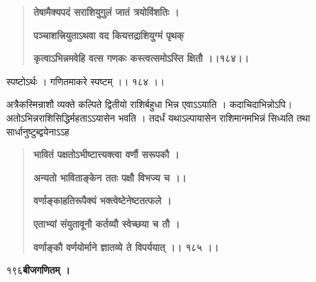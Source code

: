 \documentclass[11pt, openany]{book}
\begin{document}
\begin{sloppypar}
\begin{quote}
\hspace{1in}\textbf{तेषामैक्यपदं सराशियुगुलं जातं त्रयोविंशतिः ।}

\hspace{1in}\textbf{पञ्चाशत्त्रियुताऽथवा वद कियत्तद्राशियुग्मं पृथक्}

\hspace{1in}\textbf{कृत्वाऽभिन्नमवेहि वत्स गणकः कस्त्वत्समोऽस्ति क्षितौ ।।१८४।।}
\end{quote}

\hangindent=0.2in \hspace{0.2in}स्पष्टोऽर्थः । गणितमाकरे स्पष्टम् ।। १८४ ।। 

\hangindent=0.2in \hspace{0.2in}अत्रैकस्मिन्राशौ व्यक्ते कल्पिते द्वितीयो राशिर्बहुधा भिन्न एवाऽऽयाति । कदाचिदाभिन्नोऽपि। अतोऽभिन्नराशिसिद्धिर्महताऽऽयासेन भवति । तदर्धं यथाऽल्पायासेन राशिमानमभिन्नं सिध्यति तथा सार्धानुष्टुब्द्वयेनाऽऽह\textendash

\begin{quote}
\hspace{1in}\textbf{भावितं पक्षतोऽभीष्टात्त्यक्त्वा वर्णौ सरूपकौ ।}

\hspace{1in}\textbf{अन्यतो भाविताङ्केन ततः पक्षौ विभज्य च ।।}

\hspace{1in}\textbf{वर्णाङ्काहतिरूपैक्यं भक्त्वेष्टेनेष्टतत्फले ।}

\hspace{1in}\textbf{एताभ्यां संयुतावूनौ कर्तव्यौ स्वेच्छया च तौ ।}

\hspace{1in}\textbf{वर्णाङ्कौ वर्णयोर्माने ज्ञातव्ये ते विपर्ययात् ।। १८५ ।।}
\end{quote}
\end{sloppypar}
\thispagestyle{empty}
\newpage

\onehalfspacing
१९६\hspace{2in}\textbf{बीजगणितम् ।}

\vspace{5mm}
\end{document}
